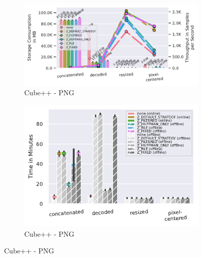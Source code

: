 \documentclass[sigconf,nonacm]{acmart}
\begin{document}
\begin{figure}[b]
  \begin{subfigure}{0.49 \columnwidth}
    \includegraphics[width=\linewidth]{../images/cubeplusplus-png-strategy-pipeline/compressed-storage-vs-throughput.pdf}
    \caption{Cube++ - PNG}
    \Description{}
    \label{fig:zlib-cpp-png-compressed-storage-vs-throughput}
  \end{subfigure}
  \hfill %
  \begin{subfigure}{0.49 \columnwidth}
    \includegraphics[width=\linewidth]{../images/cubeplusplus-png-strategy-pipeline/compression-processing-time-split.pdf}
    \caption{Cube++ - PNG}
    \Description{}
    \label{fig:zlib-cpp-png-compression-processing-time-split}
  \end{subfigure}
  

\end{figure}
\end{document}
